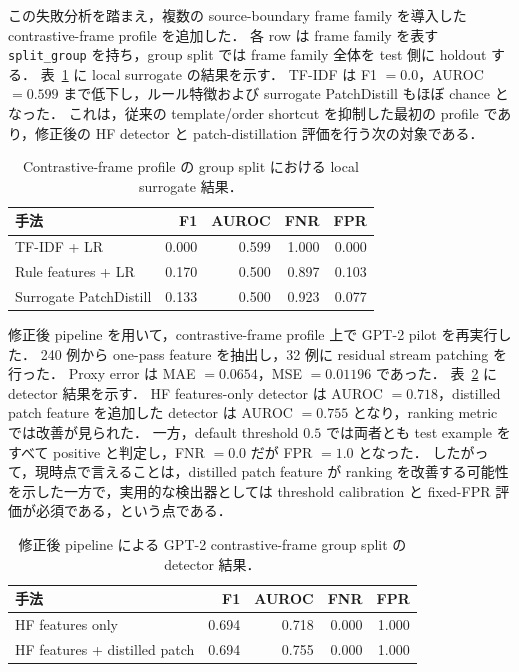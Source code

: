 \documentclass[11pt,a4paper]{ltjsarticle}
\begin{document}
この失敗分析を踏まえ，複数の source-boundary frame family を導入した contrastive-frame profile を追加した．
各 row は frame family を表す \texttt{split\_group} を持ち，group split では frame family 全体を test 側に holdout する．
表~\ref{tab:contrastive-frame} に local surrogate の結果を示す．
TF-IDF は F1 $=0.0$，AUROC $=0.599$ まで低下し，ルール特徴および surrogate PatchDistill もほぼ chance となった．
これは，従来の template/order shortcut を抑制した最初の profile であり，修正後の HF detector と patch-distillation 評価を行う次の対象である．

\begin{table}[t]
\centering
\caption{Contrastive-frame profile の group split における local surrogate 結果．}
\label{tab:contrastive-frame}
\begin{tabular}{lrrrr}
\toprule
手法 & F1 & AUROC & FNR & FPR \\
\midrule
TF-IDF + LR & 0.000 & 0.599 & 1.000 & 0.000 \\
Rule features + LR & 0.170 & 0.500 & 0.897 & 0.103 \\
Surrogate PatchDistill & 0.133 & 0.500 & 0.923 & 0.077 \\
\bottomrule
\end{tabular}
\end{table}

修正後 pipeline を用いて，contrastive-frame profile 上で GPT-2 pilot を再実行した．
240 例から one-pass feature を抽出し，32 例に residual stream patching を行った．
Proxy error は MAE $=0.0654$，MSE $=0.01196$ であった．
表~\ref{tab:corrected-gpt2-frame} に detector 結果を示す．
HF features-only detector は AUROC $=0.718$，distilled patch feature を追加した detector は AUROC $=0.755$ となり，ranking metric では改善が見られた．
一方，default threshold $0.5$ では両者とも test example をすべて positive と判定し，FNR $=0.0$ だが FPR $=1.0$ となった．
したがって，現時点で言えることは，distilled patch feature が ranking を改善する可能性を示した一方で，実用的な検出器としては threshold calibration と fixed-FPR 評価が必須である，という点である．

\begin{table}[t]
\centering
\caption{修正後 pipeline による GPT-2 contrastive-frame group split の detector 結果．}
\label{tab:corrected-gpt2-frame}
\begin{tabular}{lrrrr}
\toprule
手法 & F1 & AUROC & FNR & FPR \\
\midrule
HF features only & 0.694 & 0.718 & 0.000 & 1.000 \\
HF features + distilled patch & 0.694 & 0.755 & 0.000 & 1.000 \\
\bottomrule
\end{tabular}
\end{table}
\end{document}
